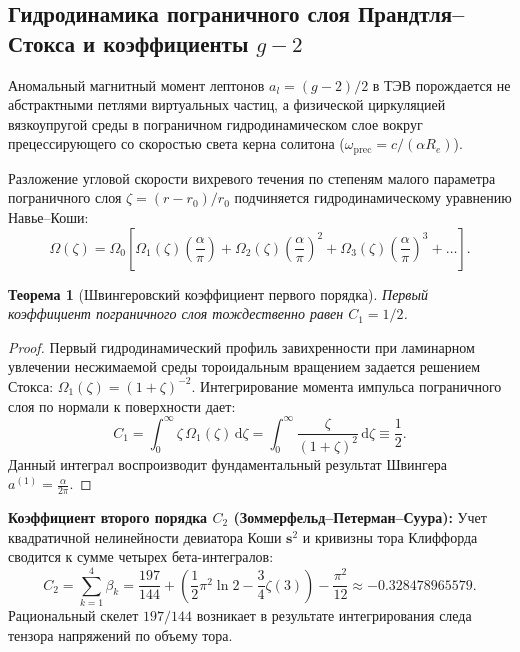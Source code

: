 \documentclass[12pt,a4paper]{article}
\newtheorem{theorem}{Теорема}[section]
\theoremstyle{definition}
\theoremstyle{remark}
\begin{document}
\subsection{Гидродинамика пограничного слоя Прандтля--Стокса и коэффициенты $g-2$}
Аномальный магнитный момент лептонов $a_l = (g-2)/2$ в ТЭВ порождается не абстрактными петлями виртуальных частиц, а физической циркуляцией вязкоупругой среды в пограничном гидродинамическом слое вокруг прецессирующего со скоростью света керна солитона ($\omega_{\mathrm{prec}} = c/(\alpha R_e)$).

Разложение угловой скорости вихревого течения по степеням малого параметра пограничного слоя $\zeta = (r - r_0)/r_0$ подчиняется гидродинамическому уравнению Навье--Коши:
\begin{equation}
	\Omega(\zeta) = \Omega_0 \left[ \Omega_1(\zeta) \left(\frac{\alpha}{\pi}\right) + \Omega_2(\zeta) \left(\frac{\alpha}{\pi}\right)^2 + \Omega_3(\zeta) \left(\frac{\alpha}{\pi}\right)^3 + \dots \right].
	\label{eq:boundary_layer_expansion}
\end{equation}

\begin{theorem}[Швингеровский коэффициент первого порядка]
	Первый коэффициент пограничного слоя тождественно равен $C_1 = 1/2$.
\end{theorem}

\begin{proof}
	Первый гидродинамический профиль завихренности при ламинарном увлечении несжимаемой среды тороидальным вращением задается решением Стокса: $\Omega_1(\zeta) = (1 + \zeta)^{-2}$. Интегрирование момента импульса пограничного слоя по нормали к поверхности дает:
	\begin{equation}
		C_1 = \int_0^\infty \zeta \, \Omega_1(\zeta) \, \mathrm{d}\zeta = \int_0^\infty \frac{\zeta}{(1+\zeta)^2} \, \mathrm{d}\zeta \equiv \frac{1}{2}.
		\label{eq:schwinger_proof}
	\end{equation}
	Данный интеграл воспроизводит фундаментальный результат Швингера $a^{(1)} = \frac{\alpha}{2\pi}$.
\end{proof}

\textbf{Коэффициент второго порядка $C_2$ (Зоммерфельд--Петерман--Суура):}
Учет квадратичной нелинейности девиатора Коши $\mathbf{s}^2$ и кривизны тора Клиффорда сводится к сумме четырех бета-интегралов:
\begin{equation}
	C_2 = \sum_{k=1}^4 \beta_k = \frac{197}{144} + \left( \frac{1}{2}\pi^2 \ln 2 - \frac{3}{4}\zeta(3) \right) - \frac{\pi^2}{12} \approx -0.328478965579.
	\label{eq:c2_exact}
\end{equation}
Рациональный скелет $197/144$ возникает в результате интегрирования следа тензора напряжений по объему тора.
\end{document}
